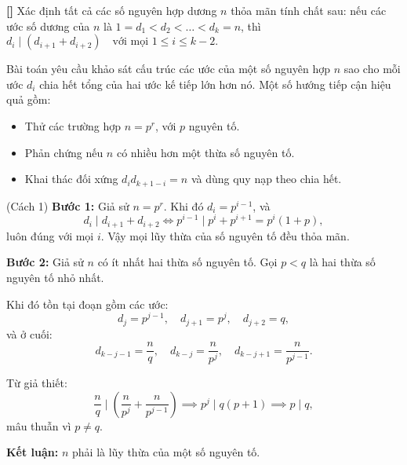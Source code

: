 \documentclass[../01-divisibility.tex]{subfiles}
\begin{document}
\begin{example*}\label{example:IMO-2023-P1}\textbf{[]}
    Xác định tất cả các số nguyên hợp dương \( n \) thỏa mãn tính chất sau: nếu các ước số dương của \( n \) là \( 1 = d_1 < d_2 < \dots < d_k = n \),
    thì \( d_i \mid (d_{i+1} + d_{i+2}) \quad \text{với mọi } 1 \leq i \leq k - 2. \)
\end{example*}

\begin{story*}
    Bài toán yêu cầu khảo sát cấu trúc các ước của một số nguyên hợp \( n \) sao cho mỗi ước \( d_i \) chia hết tổng của hai ước kế tiếp lớn hơn nó.  
    Một số hướng tiếp cận hiệu quả gồm:
    \begin{itemize}[topsep=0pt, itemsep=0pt]
        \item Thử các trường hợp \( n = p^r \), với \( p \) nguyên tố.
        \item Phản chứng nếu \( n \) có nhiều hơn một thừa số nguyên tố.
        \item Khai thác đối xứng \( d_i d_{k+1-i} = n \) và dùng quy nạp theo chia hết.
    \end{itemize}
\end{story*}

\begin{soln}(Cách 1)\footnotemark
    \textbf{Bước 1:} Giả sử \( n = p^r \). Khi đó \( d_i = p^{i-1} \), và
    \[
        d_i \mid d_{i+1} + d_{i+2} \Leftrightarrow p^{i-1} \mid p^i + p^{i+1} = p^i(1 + p),
    \]
    luôn đúng với mọi \( i \). Vậy mọi lũy thừa của số nguyên tố đều thỏa mãn.

    \textbf{Bước 2:} Giả sử \( n \) có ít nhất hai thừa số nguyên tố. Gọi \( p < q \) là hai thừa số nguyên tố nhỏ nhất.

    Khi đó tồn tại đoạn gồm các ước:
    \[
        d_j = p^{j-1},\quad d_{j+1} = p^j,\quad d_{j+2} = q,
    \]
    và ở cuối:
    \[
        d_{k-j-1} = \frac{n}{q},\quad d_{k-j} = \frac{n}{p^j},\quad d_{k-j+1} = \frac{n}{p^{j-1}}.
    \]

    Từ giả thiết:
    \[
        \frac{n}{q} \mid \left( \frac{n}{p^j} + \frac{n}{p^{j-1}} \right) \implies p^j \mid q(p + 1) \implies p \mid q,
    \]
    mâu thuẫn vì \( p \ne q \).

    \textbf{Kết luận:} \( n \) phải là lũy thừa của một số nguyên tố.
\end{soln}

\bigbreak
\end{document}
